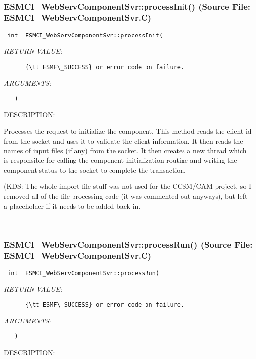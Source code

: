 
\mbox{}\hrulefill\
 
\subsubsection{ESMCI\_WebServComponentSvr::processInit() (Source File: ESMCI\_WebServComponentSvr.C)}


  
\begin{verbatim} int  ESMCI_WebServComponentSvr::processInit(\end{verbatim}{\em RETURN VALUE:}
\begin{verbatim}      {\tt ESMF\_SUCCESS} or error code on failure.\end{verbatim}{\em ARGUMENTS:}
\begin{verbatim}   )\end{verbatim}
{\sf DESCRIPTION:\\ }


      Processes the request to initialize the component.  This method reads the
      client id from the socket and uses it to validate the client information.
      It then reads the names of input files (if any) from the socket.  It
      then creates a new thread which is responsible for calling the component
      initialization routine and writing the component status to the socket
      to complete the transaction.
  
      (KDS: The whole import file stuff was not used for the CCSM/CAM project,
            so I removed all of the file processing code (it was commented out
            anyways), but left a placeholder if it needs to be added back in.
   
 
\mbox{}\hrulefill\
 
\subsubsection{ESMCI\_WebServComponentSvr::processRun() (Source File: ESMCI\_WebServComponentSvr.C)}


  
\begin{verbatim} int  ESMCI_WebServComponentSvr::processRun(\end{verbatim}{\em RETURN VALUE:}
\begin{verbatim}      {\tt ESMF\_SUCCESS} or error code on failure.\end{verbatim}{\em ARGUMENTS:}
\begin{verbatim}   )\end{verbatim}
{\sf DESCRIPTION:\\ }


